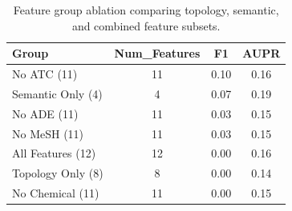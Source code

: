 \begin{table}[htbp]
\centering
\caption{Feature group ablation comparing topology, semantic, and combined feature subsets.}
\label{tab:ablation_groups}
\begin{tabular}{lccc}
\toprule
Group & Num\_Features & F1 & AUPR \\
\midrule
No ATC (11) & 11 & 0.10 & 0.16 \\
Semantic Only (4) & 4 & 0.07 & 0.19 \\
No ADE (11) & 11 & 0.03 & 0.15 \\
No MeSH (11) & 11 & 0.03 & 0.15 \\
All Features (12) & 12 & 0.00 & 0.16 \\
Topology Only (8) & 8 & 0.00 & 0.14 \\
No Chemical (11) & 11 & 0.00 & 0.15 \\
\bottomrule
\end{tabular}
\end{table}